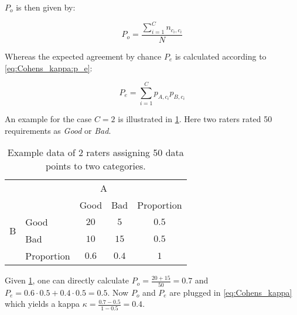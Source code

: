 $P_o$ is then given by:

\begin{equation}\label{eq:Cohens_kappa:p_o}
    P_o = \frac{\sum_{i=1}^{C} n_{c_i, c_i}}{N}
\end{equation}

Whereas the expected agreement by chance $P_e$ is calculated according to \cref{eq:Cohens_kappa:p_e}:

\begin{equation}\label{eq:Cohens_kappa:p_e}
    P_e = \sum_{i=1}^{C} p_{A, c_i} p_{B, c_i}
\end{equation}

An example for the case $C=2$ is illustrated in \cref{tab:cohens_kappa_sample_data}.
Here two raters rated 50 requirements as \textit{Good} or \textit{Bad}.

\begin{table}[htpb]
    \centering
    \begin{tabular}{l|l|c|c|c}
        \multicolumn{2}{c}{}&\multicolumn{2}{c}{A}&\\
        \cline{3-4}
        \multicolumn{2}{c|}{}&Good&Bad&\multicolumn{1}{c}{Proportion}\\
        \cline{2-4}
        \multirow{2}{*}{B}& Good & $20$ & $5$ & $0.5$\\
        \cline{2-4}
        & Bad & $10$ & $15$ & $0.5$\\
        \cline{2-4}
        \multicolumn{1}{c}{} & \multicolumn{1}{c}{Proportion} & \multicolumn{1}{c}{$0.6$} & \multicolumn{    1}{c}{$0.4$} & \multicolumn{1}{c}{$1$}\\
    \end{tabular}
    \caption[Cohen's Kappa sample data]{Example data of 2 raters assigning 50 data points to two categories.}\label{tab:cohens_kappa_sample_data}
\end{table}

Given \cref{tab:cohens_kappa_sample_data}, one can directly calculate $P_o = \frac{ 20 + 15 }{50} = 0.7$ and $P_e = 0.6 \cdot 0.5 + 0.4 \cdot 0.5 = 0.5$.
Now $P_o$ and $P_e$ are plugged in \cref{eq:Cohens_kappa} which yields a kappa $\kappa = \frac{0.7 - 0.5}{1 - 0.5} = 0.4$.

